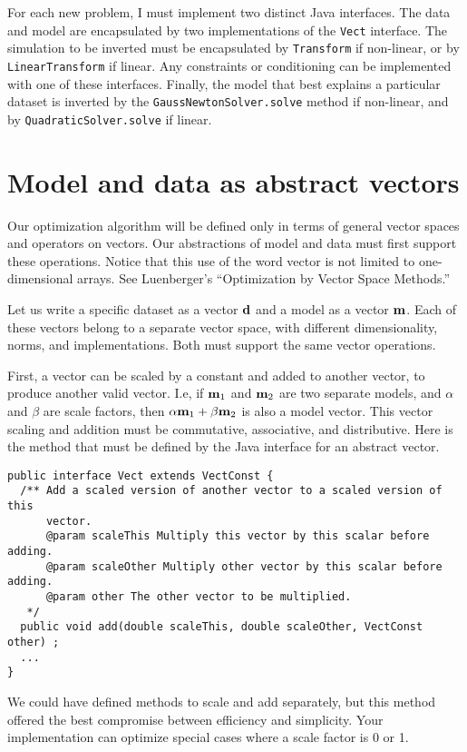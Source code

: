 \documentclass[12pt]{article}
\begin{document}
For each new problem, I must implement two
distinct Java interfaces.  The data and model
are encapsulated by two implementations of
the \texttt{Vect} interface.  The simulation
to be inverted must be encapsulated by
\texttt{Transform} if non-linear, or by
\texttt{LinearTransform} if linear.  
Any constraints or conditioning can be
implemented with one of these interfaces.
Finally,
the model that best explains a particular
dataset is inverted by the
\texttt{Gauss\-Newton\-Solver.solve} method
if non-linear, and 
by \texttt{Quadratic\-Solver.solve} if linear.

\section {Model and data as abstract vectors}

Our optimization algorithm will be defined
only in terms of general vector spaces and
operators on vectors.  Our abstractions of
model and data must first support these
operations.  Notice that this use of the word
vector is not limited to one-dimensional
arrays.  See Luenberger's
\cite{luenbergervec} ``Optimization by Vector
Space Methods.''

Let us write a specific dataset as a vector
${{\mbox{\boldmath $\bf d$}}}$ and a model as a vector ${{\mbox{\boldmath $\bf m$}}}$.  Each of
these vectors belong to a separate vector
space, with different dimensionality, norms,
and implementations.  Both must support the
same vector operations.

First, a vector can be scaled by a constant
and added to another vector, to produce
another valid vector.  I.e, if ${{\mbox{\boldmath $\bf m$}}}_1$ and
${{\mbox{\boldmath $\bf m$}}}_2$ are two separate models, and $\alpha$
and $\beta$ are scale factors, then $\alpha
{{\mbox{\boldmath $\bf m$}}}_1 + \beta {{\mbox{\boldmath $\bf m$}}}_2$ is also a model vector.
This vector scaling and addition must be
commutative, associative, and distributive.
Here is the method that must be defined by
the Java interface for an abstract vector.

{\footnotesize \begin{verbatim} 
public interface Vect extends VectConst {
  /** Add a scaled version of another vector to a scaled version of this
      vector.
      @param scaleThis Multiply this vector by this scalar before adding.
      @param scaleOther Multiply other vector by this scalar before adding.
      @param other The other vector to be multiplied.
   */
  public void add(double scaleThis, double scaleOther, VectConst other) ;
  ...
}
\end{verbatim}} 

\noindent We could have defined methods to
scale and add separately, but this method
offered the best compromise between
efficiency and simplicity.  Your
implementation can optimize special cases
where a scale factor is 0 or 1.
\end{document}
